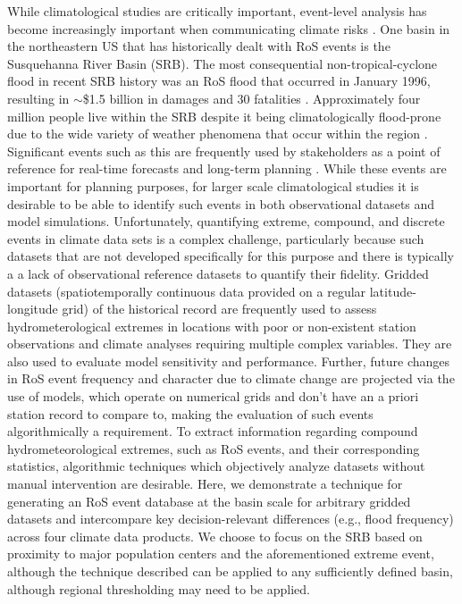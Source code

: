 \documentclass[nhess, manuscript]{copernicus}
\begin{document}
While climatological studies are critically important, event-level analysis has become increasingly important when communicating climate risks \citep{shepherd2018storylines}.
One basin in the northeastern US that has historically dealt with RoS events is the Susquehanna River Basin (SRB).
The most consequential non-tropical-cyclone flood in recent SRB history was an RoS flood that occurred in January 1996, resulting in $\sim$\$1.5 billion in damages and 30 fatalities \citep{leathers1998severe}.
Approximately four million people live within the SRB \citep{leathers2008hydroclimatic} despite it being climatologically flood-prone due to the wide variety of weather phenomena that occur within the region \citep{perry2000significant}.
Significant events such as this are frequently used by stakeholders as a point of reference for real-time forecasts and long-term planning \citep{george2019the}.
While these events are important for planning purposes, for larger scale climatological studies it is desirable to be able to identify such events in both observational datasets and model simulations.  Unfortunately,  quantifying extreme, compound, and discrete events in climate data sets is  a complex challenge, particularly because such  datasets that are not developed specifically for this purpose and there is typically a  a lack of observational reference datasets to quantify their fidelity.
Gridded datasets (spatiotemporally continuous data provided on a regular latitude-longitude grid) of the historical record are frequently used to assess hydrometerological extremes in locations with poor or non-existent station observations and climate analyses requiring multiple complex variables.
They are also used to evaluate model sensitivity and performance.
Further, future changes in RoS event frequency and character due to climate change are projected via the use of models, which operate on numerical grids and don't have an a priori station record to compare to, making the evaluation of such events algorithmically a requirement.
To extract information regarding compound hydrometeorological extremes, such as RoS events, and their corresponding statistics, algorithmic techniques which objectively analyze datasets without manual intervention are desirable.
Here, we demonstrate a technique for generating an RoS event database at the basin scale for arbitrary gridded datasets and intercompare key decision-relevant differences (e.g., flood frequency) across four climate data products.
We choose to focus on the SRB based on proximity to major population centers and the aforementioned extreme event, although the technique described can be applied to any sufficiently defined basin, although regional thresholding may need to be applied.
\end{document}

